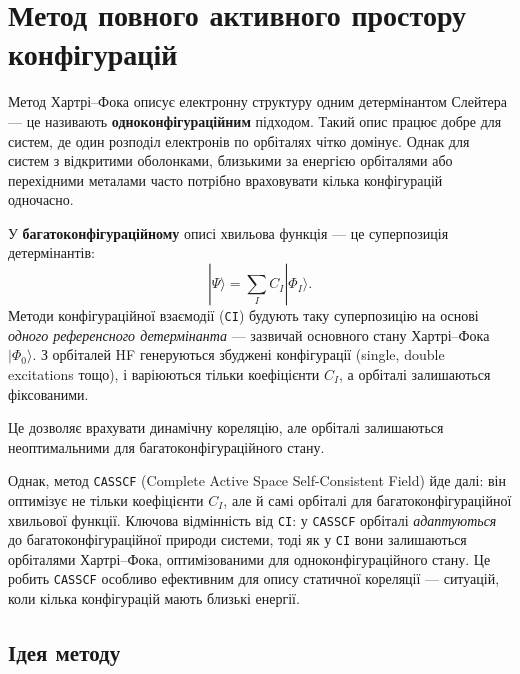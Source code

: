 
\section{Метод повного активного простору конфігурацій}

Метод Хартрі–Фока описує електронну структуру одним детермінантом
Слейтера --- це називають \textbf{одноконфігураційним} підходом.
Такий опис працює добре для систем, де один розподіл електронів
по орбіталях чітко домінує. Однак для систем з відкритими оболонками,
близькими за енергією орбіталями або перехідними металами часто
потрібно враховувати кілька конфігурацій одночасно.

У \textbf{багатоконфігураційному} описі хвильова функція --- це
суперпозиція детермінантів:
\begin{equation}\label{eq:CAS_WF}
    |\Psi\rangle = \sum_I C_I |\Phi_I\rangle.
\end{equation}
Методи конфігураційної взаємодії (\texttt{CI}) будують таку суперпозицію
на основі \emph{одного референсного детермінанта} --- зазвичай основного
стану Хартрі–Фока $|\Phi_0\rangle$. З орбіталей HF генеруються збуджені
конфігурації (single, double excitations тощо), і варіюються тільки
коефіцієнти $C_I$, а орбіталі залишаються фіксованими.

Це дозволяє врахувати динамічну кореляцію, але орбіталі залишаються
неоптимальними для багатоконфігураційного стану.

Однак, метод \texttt{CASSCF} (Complete Active Space Self-Consistent Field)
йде далі: він оптимізує не тільки коефіцієнти $C_I$, але й самі орбіталі
для багатоконфігураційної хвильової функції. Ключова відмінність від
\texttt{CI}: у \texttt{CASSCF} орбіталі \emph{адаптуються} до
багатоконфігураційної природи системи, тоді як у \texttt{CI} вони залишаються
орбіталями Хартрі–Фока, оптимізованими для одноконфігураційного стану.
Це робить \texttt{CASSCF} особливо ефективним для опису статичної
кореляції --- ситуацій, коли кілька конфігурацій мають близькі енергії.

\subsection{Ідея методу}

